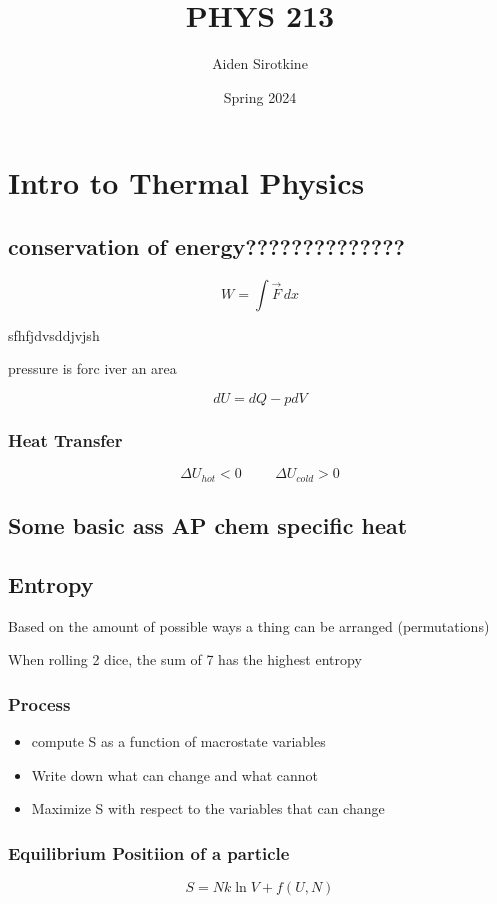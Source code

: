 \documentclass[fleqn]{report}
\date{Spring 2024}
\title{PHYS 213}
\author{Aiden Sirotkine}
\newcommand{\hp}{\hspace{1cm}}
\begin{document}
\pagestyle{fancy}
\maketitle
\tableofcontents
\clearpage

\chapter{Intro to Thermal Physics}

\section*{conservation of energy??????????????}
\[
W = \int \vec{F} \, dx
\]

sfhfjdvsddjvjsh

pressure is forc iver an area

\[
dU = dQ - pdV
\]

\subsection{Heat Transfer}
\[
\Delta U_{hot} < 0 \hp \Delta U_{cold} > 0
\]

\section{Some basic ass AP chem specific heat}

\section{Entropy}
Based on the amount of possible ways a thing can be arranged (permutations)

When rolling 2 dice, the sum of 7 has the highest entropy

\subsection{Process}
\begin{itemize}
\item
compute S as a function of macrostate variables
\item
Write down what can change and what cannot
\item
Maximize S with respect to the variables that can change
\end{itemize}


\subsection{Equilibrium Positiion of a particle}
\[
S = N k \ln V + f(U, N)
\]
\end{document}
